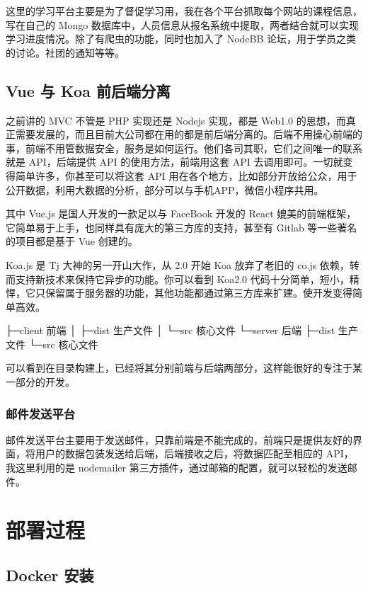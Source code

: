 这里的学习平台主要是为了督促学习用，我在各个平台抓取每个网站的课程信息，写在自己的 Mongo 数据库中，人员信息从报名系统中提取，两者结合就可以实现学习进度情况。除了有爬虫的功能，同时也加入了 NodeBB 论坛，用于学员之类的讨论。社团的通知等等。

\subsection{Vue 与 Koa 前后端分离}

之前讲的 MVC 不管是 PHP 实现还是 Nodejs 实现，都是 Web1.0 的思想，而真正需要发展的，而且目前大公司都在用的都是前后端分离的。后端不用操心前端的事，前端不用管数据安全，服务是如何运行。他们各司其职，它们之间唯一的联系就是 API，后端提供 API 的使用方法，前端用这套 API 去调用即可。一切就变得简单许多，你甚至可以将这套 API 用在各个地方，比如部分开放给公众，用于公开数据，利用大数据的分析，部分可以与手机APP，微信小程序共用。

其中 Vue.js 是国人开发的一款足以与 FaceBook 开发的 React 媲美的前端框架，它简单易于上手，也同样具有庞大的第三方库的支持，甚至有 Gitlab 等一些著名的项目都是基于 Vue 创建的。

Koa.js 是 Tj 大神的另一开山大作，从 2.0 开始 Koa 放弃了老旧的 co.js 依赖，转而支持新技术来保持它异步的功能。你可以看到 Koa2.0 代码十分简单，短小，精悍，它只保留属于服务器的功能，其他功能都通过第三方库来扩建。使开发变得简单高效。

\begin{code}
├─client        前端
│   ├─dist   生产文件
│   └─src    核心文件
└─server        后端
    ├─dist   生产文件
    └─src    核心文件
\end{code}

可以看到在目录构建上，已经将其分别前端与后端两部分，这样能很好的专注于某一部分的开发。

\subsubsection{邮件发送平台}

邮件发送平台主要用于发送邮件，只靠前端是不能完成的，前端只是提供友好的界面，将用户的数据包装发送给后端，后端接收之后，将数据匹配至相应的 API，我这里利用的是 nodemailer 第三方插件，通过邮箱的配置，就可以轻松的发送邮件。

\section{部署过程}

\subsection{Docker 安装}

